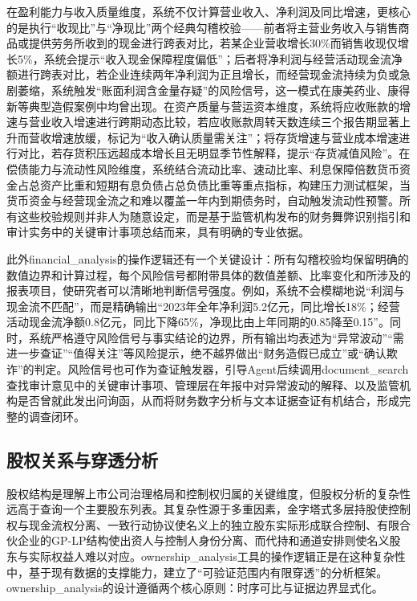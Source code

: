 在盈利能力与收入质量维度，系统不仅计算营业收入、净利润及同比增速，更核心的是执行“收现比”与“净现比”两个经典勾稽校验——前者将主营业务收入与销售商品或提供劳务所收到的现金进行跨表对比，若某企业营收增长30\%而销售收现仅增长5\%，系统会提示“收入现金保障程度偏低”；后者将净利润与经营活动现金流净额进行跨表对比，若企业连续两年净利润为正且增长，而经营现金流持续为负或急剧萎缩，系统触发“账面利润含金量存疑”的风险信号，这一模式在康美药业、康得新等典型造假案例中均曾出现。在资产质量与营运资本维度，系统将应收账款的增速与营业收入增速进行跨期动态比较，若应收账款周转天数连续三个报告期显著上升而营收增速放缓，标记为“收入确认质量需关注”；将存货增速与营业成本增速进行对比，若存货积压远超成本增长且无明显季节性解释，提示“存货减值风险”。在偿债能力与流动性风险维度，系统结合流动比率、速动比率、利息保障倍数货币资金占总资产比重和短期有息负债占总负债比重等重点指标，构建压力测试框架，当货币资金与经营现金流之和难以覆盖一年内到期债务时，自动触发流动性预警。所有这些校验规则并非人为随意设定，而是基于监管机构发布的财务舞弊识别指引和审计实务中的关键审计事项总结而来，具有明确的专业依据。

此外financial\_analysis的操作逻辑还有一个关键设计：所有勾稽校验均保留明确的数值边界和计算过程，每个风险信号都附带具体的数值差额、比率变化和所涉及的报表项目，使研究者可以清晰地判断信号强度。例如，系统不会模糊地说“利润与现金流不匹配”，而是精确输出“2023年全年净利润5.2亿元，同比增长18\%；经营活动现金流净额0.8亿元，同比下降65\%，净现比由上年同期的0.85降至0.15”。同时，系统严格遵守风险信号与事实结论的边界，所有输出均表述为“异常波动”“需进一步查证”“值得关注”等风险提示，绝不越界做出“财务造假已成立”或“确认欺诈”的判定。风险信号也可作为查证触发器，引导Agent后续调用document\_search查找审计意见中的关键审计事项、管理层在年报中对异常波动的解释、以及监管机构是否曾就此发出问询函，从而将财务数字分析与文本证据查证有机结合，形成完整的调查闭环。

\subsection{股权关系与穿透分析}

股权结构是理解上市公司治理格局和控制权归属的关键维度，但股权分析的复杂性远高于查询一个主要股东列表。其复杂性源于多重因素，金字塔式多层持股使控制权与现金流权分离、一致行动协议使名义上的独立股东实际形成联合控制、有限合伙企业的GP-LP结构使出资人与控制人身份分离、而代持和通道安排则使名义股东与实际权益人难以对应。ownership\_analysis工具的操作逻辑正是在这种复杂性中，基于现有数据的支撑能力，建立了“可验证范围内有限穿透”的分析框架。ownership\_analysis的设计遵循两个核心原则：时序可比与证据边界显式化。

